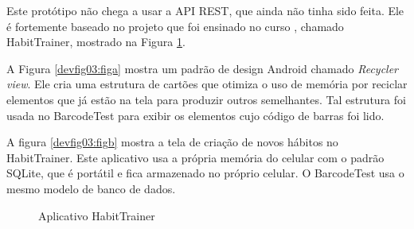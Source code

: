 Este protótipo não chega a usar a API REST, que ainda não tinha sido feita. Ele é fortemente baseado no projeto que foi ensinado no curso \cite{kotlinandroid}, chamado HabitTrainer, mostrado na Figura \ref{devfig03}.

A Figura \ref{devfig03:figa} mostra um padrão de design Android chamado \textit{Recycler view}. Ele cria uma estrutura de cartões que otimiza o uso de memória por reciclar elementos que já estão na tela para produzir outros semelhantes. Tal estrutura foi usada no BarcodeTest para exibir os elementos cujo código de barras foi lido.

A figura \ref{devfig03:figb} mostra a tela de criação de novos hábitos no HabitTrainer. Este aplicativo usa a própria memória do celular com o padrão SQLite, que é portátil e fica armazenado no próprio celular. O BarcodeTest usa o mesmo modelo de banco de dados.

\begin{figure}[ht!]
	\centering
    \quad
    \caption{Aplicativo HabitTrainer}
    \label{devfig03}
\end{figure}

